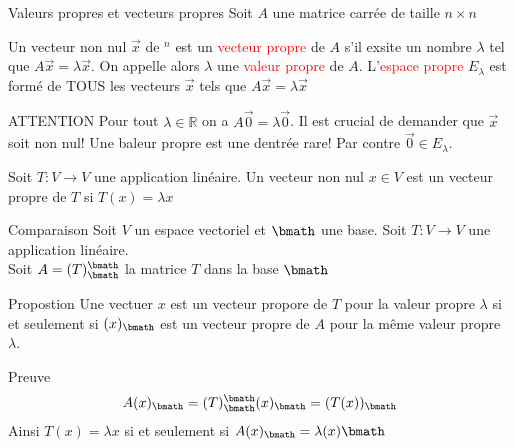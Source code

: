 \begin{parag}{Valeurs propres et vecteurs propres}
Soit $A$ une matrice carrée de taille $n \times n$
    \begin{definition}
        Un vecteur non nul $\vec{x}$ de \R$^n$ est un \textcolor{red}{vecteur propre} de $A$ s'il exsite un nombre $\lambda$ tel que $A\vec{x} = \lambda \vec{x}$. On appelle alors $\lambda$ une \textcolor{red}{valeur propre} de $A$. L'\textcolor{red}{espace propre} $E_\lambda$ est formé de TOUS les vecteurs $\vec{x}$ tels que $A\vec{x} = \lambda\vec{x}$
    \end{definition}
    \begin{subparag}{ATTENTION}
        Pour tout $\lambda \in \mathbb{R}$ on a $A\vec{0} = \lambda \vec{0}$. Il est crucial de demander que $\vec{x}$ soit non nul! Une baleur propre est une dentrée rare! Par contre $\vec{0} \in E_\lambda$.
    \end{subparag}

    \begin{definition}
        Soit $T : V \to V$ une application linéaire. Un vecteur non nul $x \in V$ est un vecteur propre de $T$ si $T(x) = \lambda x$
    \end{definition}

    \begin{subparag}{Comparaison}
        Soit $V$ un espace vectoriel et $\bmath$ une base. Soit $T: V \to V$ une application linéaire.
        \\
        Soit $A = (T)_\bmath^\bmath$ la matrice $T$ dans la base $\bmath$

    \end{subparag}


    \begin{subparag}{Propostion}
        Une vectuer $x$ est un vecteur propore de $T$ pour la valeur propre $\lambda$ si et seulement si $(x)_\bmath$ est un vecteur propre de $A$ pour la même valeur propre $\lambda$.
        \end{subparag}
    \begin{subparag}{Preuve}
        \[A(x)_\bmath = (T)_\bmath^\bmath(x)_\bmath = (T(x))_\bmath\]
        Ainsi $T(x) = \lambda x$ si et seulement si $A(x)_\bmath = \lambda(x)\bmath$
    \end{subparag}


\end{parag}
